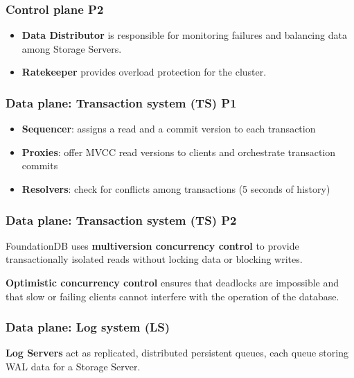 

\begin{frame}
    \frametitle{Control plane P2}
    
\begin{itemize}
\item \textbf{Data Distributor} is responsible for monitoring failures and balancing data among Storage Servers.
\item \textbf{Ratekeeper} provides overload protection for the cluster.
\end{itemize}
	
\end{frame}


\begin{frame}
	\frametitle{Data plane: Transaction system (TS) P1}
 
\begin{itemize}
    \item \textbf{Sequencer}: assigns a read and a commit version to each transaction
    \item \textbf{Proxies}: offer MVCC read versions to clients and orchestrate transaction commits
    \item \textbf{Resolvers}: check for conflicts among transactions (5 seconds of history)
\end{itemize}
	
\end{frame}


\begin{frame}
	\frametitle{Data plane: Transaction system (TS) P2}

FoundationDB uses \textbf{multiversion concurrency control} to provide transactionally isolated reads without locking data or blocking writes.
\vspace{0.5cm}

\textbf{Optimistic concurrency control} ensures that deadlocks are impossible and that slow or failing clients cannot interfere with the operation of the database.
	
\end{frame}



\begin{frame}
	\frametitle{Data plane: Log system (LS)}

\textbf{Log Servers} act as replicated, distributed persistent queues, each queue storing WAL data for a Storage Server.
	
\end{frame}


